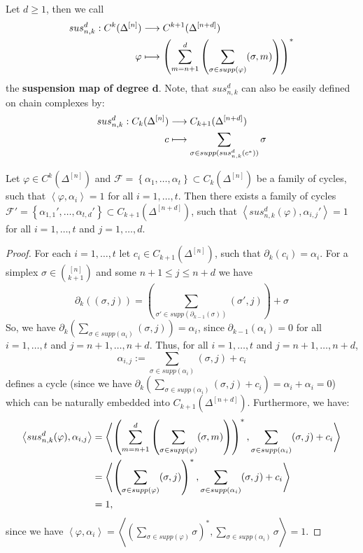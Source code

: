 \begin{defi}
Let \(d\geq 1\), then we call
\begin{align}
sus_{n,k}^d:C^k(\Delta^{[n]})&\longrightarrow C^{k+1}(\Delta^{[n+d]})\notag\\
\varphi&\longmapsto\left(\sum\limits_{m=n+1}^d\left(\sum\limits_{\sigma\in supp(\varphi)}(\sigma,m)\right)\right)^*\notag
\end{align}
the \textbf{suspension map of degree d}. Note, that \(sus_{n,k}^d\) can also be easily defined on chain complexes by:
\begin{align}
sus_{n,k}^d:C_k(\Delta^{[n]})&\longrightarrow C_{k+1}(\Delta^{[n+d]})\notag\\
c&\longmapsto\sum\limits_{\sigma\in supp(sus_{n,k}^d(c^*))}\sigma\notag
\end{align}
\end{defi}

\begin{lem}\label{lemma11}
Let \(\varphi\in C^k(\Delta^{[n]})\) and \(\mathcal{F}=\left\{\alpha_1,\ldots,\alpha_t\right\}\subset C_k(\Delta^{[n]})\) be a family of cycles, such that \(\left\langle\varphi,\alpha_i\right\rangle=1\) for all \(i=1,\ldots,t\). Then there exists a family of cycles \(\mathcal{F}'=\left\{\alpha_{1,1}',\ldots,\alpha_{t,d}'\right\}\subset C_{k+1}(\Delta^{[n+d]})\), such that \(\left\langle sus_{n,k}^d(\varphi),\alpha_{i,j}'\right\rangle=1\) for all \(i=1,\ldots,t\) and \(j=1,\ldots,d\).
\begin{proof}
For each \(i=1,\ldots,t\) let \(c_i\in C_{k+1}(\Delta^{[n]})\), such that \(\partial_k(c_i)=\alpha_i\). For a simplex \(\sigma\in\binom{[n]}{k+1}\) and some \(n+1\leq j\leq n+d\) we have
\[
\partial_k\left((\sigma,j)\right)=\left(\sum\limits_{\sigma'\in supp(\partial_{k-1}(\sigma))}(\sigma',j)\right)+\sigma
\]
So, we have \(\partial_k\left(\sum\limits_{\sigma\in supp(\alpha_i)}(\sigma,j)\right)=\alpha_i\), since \(\partial_{k-1}(\alpha_i)=0\) for all \(i=1,\ldots,t\) and \(j=n+1,\ldots,n+d\). Thus, for all \(i=1,\ldots,t\) and \(j=n+1,\ldots,n+d\),
\[
\alpha_{i,j}:=\sum\limits_{\sigma\in supp(\alpha_i)}(\sigma,j)+c_i
\]
defines a cycle (since we have \(\partial_k\left(\sum\limits_{\sigma\in supp(\alpha_i)}(\sigma,j)+c_i\right)=\alpha_i+\alpha_i=0\)) which can be naturally embedded into \(C_{k+1}(\Delta^{[n+d]})\). Furthermore, we have:
\begin{align}
\left\langle sus_{n,k}^d(\varphi),\alpha_{i,j}\right\rangle&=\left\langle\left(\sum\limits_{m=n+1}^d\left(\sum\limits_{\sigma\in supp(\varphi)}(\sigma,m)\right)\right)^*,\sum\limits_{\sigma\in supp(\alpha_i)}(\sigma,j)+c_i\right\rangle\notag\\
&=\left\langle\left(\sum\limits_{\sigma\in supp(\varphi)}(\sigma,j)\right)^*,\sum\limits_{\sigma\in supp(\alpha_i)}(\sigma,j)+c_i\right\rangle\notag\\
&=1,\notag
\end{align}
since we have \(\left\langle\varphi,\alpha_i\right\rangle=\left\langle\left(\sum\limits_{\sigma\in supp(\varphi)}\sigma\right)^*,\sum\limits_{\sigma\in supp(\alpha_i)}\sigma\right\rangle=1\).
\end{proof}
\end{lem}

